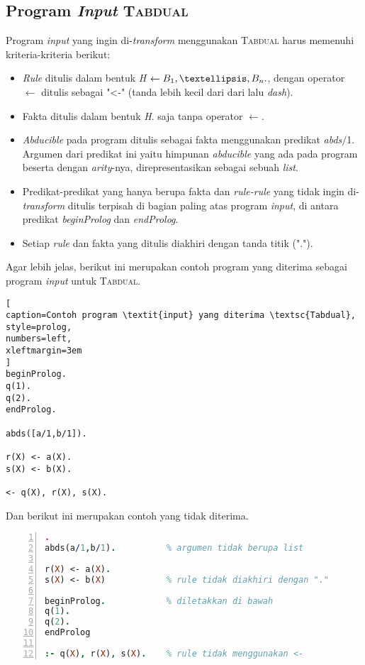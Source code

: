 \subsection{Program \textit{Input} \textsc{Tabdual}}
Program \textit{input} yang ingin di-\textit{transform} menggunakan \textsc{Tabdual} harus memenuhi kriteria-kriteria berikut:

\begin{itemize}
	\item \textit{Rule} ditulis dalam bentuk \textit{H $\leftarrow B_1, \textellipsis,B_n.$}, dengan operator $\leftarrow$ ditulis sebagai "<-" (tanda lebih kecil dari dari lalu \textit{dash}).
	\item Fakta ditulis dalam bentuk \textit{H}. saja tanpa operator $\leftarrow$.
	\item \textit{Abducible} pada program ditulis sebagai fakta menggunakan predikat \textit{abds$/$}1. Argumen dari predikat ini yaitu himpunan \textit{abducible} yang ada pada program beserta dengan \textit{arity}-nya, direpresentasikan sebagai sebuah \textit{list}.
	\item Predikat-predikat yang hanya berupa fakta dan \textit{rule-rule} yang tidak ingin di-\textit{transform} ditulis terpisah di bagian paling atas program \textit{input}, di antara predikat \textit{beginProlog} dan \textit{endProlog}. 
	\item Setiap \textit{rule} dan fakta yang ditulis diakhiri dengan tanda titik (".").
\end{itemize}

\noindent Agar lebih jelas, berikut ini merupakan contoh program yang diterima sebagai program \textit{input} untuk \textsc{Tabdual}.
\\

\begin{lstlisting}[
caption=Contoh program \textit{input} yang diterima \textsc{Tabdual},
style=prolog,
numbers=left,
xleftmargin=3em
]
beginProlog.
q(1).
q(2).
endProlog.

abds([a/1,b/1]).

r(X) <- a(X).
s(X) <- b(X).

<- q(X), r(X), s(X).
\end{lstlisting}

\noindent Dan berikut ini merupakan contoh yang tidak diterima.
\\

\begin{lstlisting}[language=Prolog,
caption=Contoh program \textit{input} yang tidak diterima \textsc{Tabdual},
style=prolog,
numbers=left,
xleftmargin=3em
].
abds(a/1,b/1).			% argumen tidak berupa list

r(X) <- a(X).
s(X) <- b(X)			% rule tidak diakhiri dengan "."

beginProlog.			% diletakkan di bawah
q(1).
q(2).
endProlog

:- q(X), r(X), s(X).	% rule tidak menggunakan <-
\end{lstlisting}

